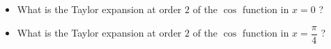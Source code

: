 \bexo


\begin{itemize}
	\item What is the Taylor expansion at order $2$ of the $\cos$ function in $x=0$ ?
	\item What is the Taylor expansion at order $2$ of the $\cos$ function in $x=\dfrac{\pi}{4}$ ?
\end{itemize}
 

\eexo
{}
